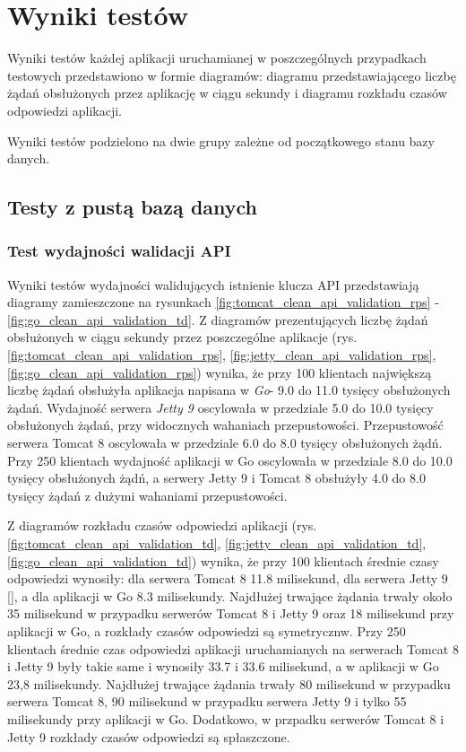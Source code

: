 \chapter{Wyniki testów}
Wyniki testów każdej aplikacji uruchamianej w poszczególnych przypadkach  testowych przedstawiono w formie diagramów: diagramu przedstawiającego liczbę żądań obsłużonych przez aplikację w ciągu sekundy i diagramu rozkładu czasów odpowiedzi aplikacji.

Wyniki testów podzielono na dwie grupy zależne od początkowego stanu bazy danych.

\section{Testy z pustą bazą danych}

\subsection{Test wydajności walidacji API}
Wyniki testów wydajności walidujących istnienie klucza API przedstawiają diagramy zamieszczone na rysunkach \ref{fig:tomcat_clean_api_validation_rps} - \ref{fig:go_clean_api_validation_td}. 
Z diagramów prezentujących liczbę żądań obsłużonych w ciągu sekundy przez poszczególne aplikacje (rys. \ref{fig:tomcat_clean_api_validation_rps}, \ref{fig:jetty_clean_api_validation_rps}, \ref{fig:go_clean_api_validation_rps}) wynika, że przy 100 klientach największą liczbę żądań obsłużyła aplikacja napisana w \textsl{Go}- 9.0 do 11.0 tysięcy obsłużonych żądań. Wydajność serwera \textsl{Jetty 9} oscylowała w przedziale 5.0 do 10.0 tysięcy obsłużonych żądań, przy widocznych wahaniach przepustowości. Przepustowość serwera Tomcat 8 oscylowała w przedziale 6.0 do 8.0 tysięcy obsłużonych żądń.  Przy 250 klientach wydajność aplikacji w Go oscylowała w przedziale 8.0 do 10.0 tysięcy obsłużonych żądń, a serwery Jetty 9 i Tomcat 8 obsłużyły 4.0 do 8.0 tysięcy żądań z dużymi wahaniami przepustowości.      

Z diagramów rozkładu czasów odpowiedzi aplikacji (rys. \ref{fig:tomcat_clean_api_validation_td}, \ref{fig:jetty_clean_api_validation_td}, \ref{fig:go_clean_api_validation_td}) wynika, że przy 100 klientach średnie czasy odpowiedzi wynosiły: dla serwera Tomcat 8 11.8 milisekund, dla serwera Jetty 9 [], a dla aplikacji w Go 8.3 milisekundy. Najdłużej trwające żądania trwały około 35 milisekund w przypadku serwerów Tomcat 8 i Jetty 9 oraz 18 milisekund przy aplikacji w Go, a rozkłady czasów odpowiedzi są symetrycznw.  Przy 250 klientach średnie czas odpowiedzi aplikacji uruchamianych na serwerach Tomcat 8 i Jetty 9 były takie same i wynosiły 33.7 i 33.6 milisekund, a w aplikacji w Go 23,8 milisekundy. Najdłużej trwające żądania trwały  80 milisekund w przypadku serwera Tomcat 8, 90 milisekund w przypadku serwera Jetty 9 i tylko 55 milisekundy przy aplikacji w Go. Dodatkowo, w przpadku serwerów Tomcat 8 i Jetty 9 rozkłady czasów odpowiedzi są spłaszczone. 

